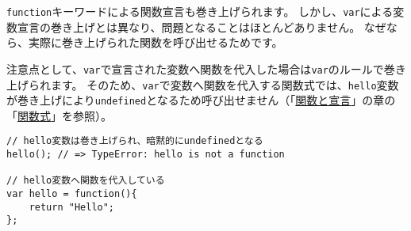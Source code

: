 \texttt{function}キーワードによる関数宣言も巻き上げられます。
しかし、\texttt{var}による変数宣言の巻き上げとは異なり、問題となることはほとんどありません。
なぜなら、実際に巻き上げられた関数を呼び出せるためです。

注意点として、\texttt{var}で宣言された変数へ関数を代入した場合は\texttt{var}のルールで巻き上げられます。
そのため、\texttt{var}で変数へ関数を代入する関数式では、\texttt{hello}変数が巻き上げにより\texttt{undefined}となるため呼び出せません（「\hyperlink{function-and-declaration}{関数と宣言}」の章の「\hyperlink{function-expression}{関数式}」を参照）。

\begin{lstlisting}
// hello変数は巻き上げられ、暗黙的にundefinedとなる
hello(); // => TypeError: hello is not a function

// hello変数へ関数を代入している
var hello = function(){
    return "Hello";
};
\end{lstlisting}

